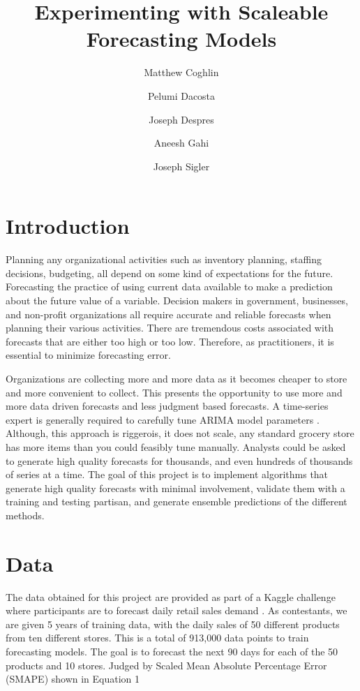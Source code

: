 \documentclass[16pt,twocolumn,letterpaper]{article}
\title{Experimenting with Scaleable Forecasting Models}
\author{
    Matthew Coghlin\\
  	\and
  	Pelumi Dacosta\\
    \and
    Joseph Despres\\
    \and
    Aneesh Gahi\\
    \and
    Joseph Sigler\\
}
\begin{document}
\maketitle


\section{Introduction}

Planning any organizational activities such as inventory planning, staffing decisions, budgeting, all depend on some kind of expectations for the future. Forecasting the practice of using current data available to make a prediction about the future value of a variable. Decision makers in government, businesses, and non-profit organizations all require accurate and reliable forecasts when planning their various activities. There are tremendous costs associated with forecasts that are either too high or too low. Therefore, as practitioners, it is essential to minimize forecasting error. 

Organizations are collecting more and more data as it becomes cheaper to store and more convenient to collect. This presents the opportunity to use more and more data driven forecasts and less judgment based forecasts. A time-series expert is generally required to carefully tune ARIMA model parameters \cite{taylor2018forecasting}. Although, this approach is riggerois, it does not scale, any standard grocery store has more items than you could feasibly tune manually. Analysts could be asked to generate high quality forecasts for thousands, and even hundreds of thousands of series at a time. The goal of this project is to implement algorithms that generate high quality forecasts with minimal involvement, validate them with a training and testing partisan, and generate ensemble predictions of the different methods.

\section{Data}

The data obtained for this project are provided as part of a Kaggle challenge where participants are to forecast daily retail sales demand \cite{kaggle}. As contestants, we are given 5 years of training data, with the daily sales of 50 different products from ten different stores. This is a total of 913,000 data points to train forecasting models. The goal is to forecast the next 90 days for each of the 50 products and 10 stores. Judged by Scaled Mean Absolute Percentage Error (SMAPE) shown in Equation 1
\end{document}
